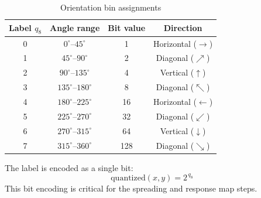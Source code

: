 \documentclass[12pt,a4paper]{article}
\begin{document}
\begin{table}[H]
  \centering
  \caption{Orientation bin assignments}
  \label{tab:bins}
  \begin{tabular}{cccc}
    \toprule
    \textbf{Label $q_8$} & \textbf{Angle range}          & \textbf{Bit value} & \textbf{Direction}             \\
    \midrule
    0 & $0^\circ$--$45^\circ$    &   1 & Horizontal ($\rightarrow$)  \\
    1 & $45^\circ$--$90^\circ$   &   2 & Diagonal ($\nearrow$)       \\
    2 & $90^\circ$--$135^\circ$  &   4 & Vertical ($\uparrow$)       \\
    3 & $135^\circ$--$180^\circ$ &   8 & Diagonal ($\nwarrow$)       \\
    4 & $180^\circ$--$225^\circ$ &  16 & Horizontal ($\leftarrow$)   \\
    5 & $225^\circ$--$270^\circ$ &  32 & Diagonal ($\swarrow$)       \\
    6 & $270^\circ$--$315^\circ$ &  64 & Vertical ($\downarrow$)     \\
    7 & $315^\circ$--$360^\circ$ & 128 & Diagonal ($\searrow$)       \\
    \bottomrule
  \end{tabular}
\end{table}

The label is encoded as a single bit:
\begin{equation}
  \text{quantized}(x,y) = 2^{\,q_8}
\end{equation}
This bit encoding is critical for the spreading and response map steps.
\end{document}
